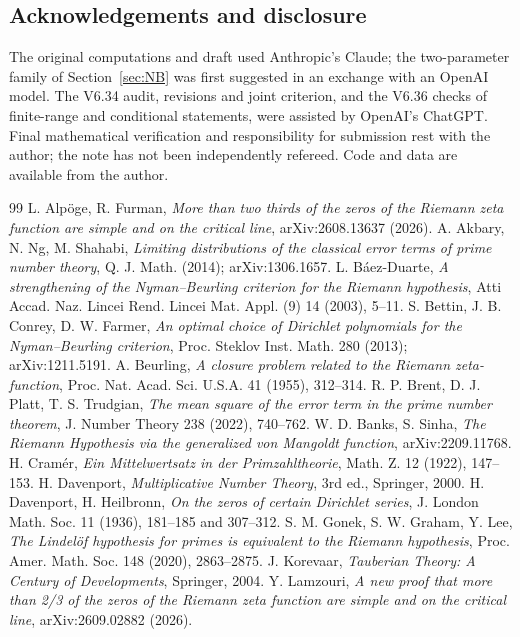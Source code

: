 \documentclass[11pt]{amsart}
\theoremstyle{remark}
\theoremstyle{definition}
\begin{document}
\subsection*{Acknowledgements and disclosure}
The original computations and draft used Anthropic's Claude; the two-parameter family of Section~\ref{sec:NB} was first suggested in an exchange with an OpenAI model. The V6.34 audit, revisions and joint criterion, and the V6.36 checks of finite-range and conditional statements, were assisted by OpenAI's ChatGPT. Final mathematical verification and responsibility for submission rest with the author; the note has not been independently refereed. Code and data are available from the author.

\begin{thebibliography}{99}
 L. Alp\"oge, R. Furman, \emph{More than two thirds of the zeros of the Riemann zeta function are simple and on the critical line}, arXiv:2608.13637 (2026).
 A. Akbary, N. Ng, M. Shahabi, \emph{Limiting distributions of the classical error terms of prime number theory}, Q. J. Math. (2014); arXiv:1306.1657.
 L. B\'aez-Duarte, \emph{A strengthening of the Nyman--Beurling criterion for the Riemann hypothesis}, Atti Accad. Naz. Lincei Rend. Lincei Mat. Appl. (9) 14 (2003), 5--11.
 S. Bettin, J. B. Conrey, D. W. Farmer, \emph{An optimal choice of Dirichlet polynomials for the Nyman--Beurling criterion}, Proc. Steklov Inst. Math. 280 (2013); arXiv:1211.5191.
 A. Beurling, \emph{A closure problem related to the Riemann zeta-function}, Proc. Nat. Acad. Sci. U.S.A. 41 (1955), 312--314.
 R. P. Brent, D. J. Platt, T. S. Trudgian, \emph{The mean square of the error term in the prime number theorem}, J. Number Theory 238 (2022), 740--762.
 W. D. Banks, S. Sinha, \emph{The Riemann Hypothesis via the generalized von Mangoldt function}, arXiv:2209.11768.
 H. Cram\'er, \emph{Ein Mittelwertsatz in der Primzahltheorie}, Math. Z. 12 (1922), 147--153.
 H. Davenport, \emph{Multiplicative Number Theory}, 3rd ed., Springer, 2000.
 H. Davenport, H. Heilbronn, \emph{On the zeros of certain Dirichlet series}, J. London Math. Soc. 11 (1936), 181--185 and 307--312.
 S. M. Gonek, S. W. Graham, Y. Lee, \emph{The Lindel\"of hypothesis for primes is equivalent to the Riemann hypothesis}, Proc. Amer. Math. Soc. 148 (2020), 2863--2875.
 J. Korevaar, \emph{Tauberian Theory: A Century of Developments}, Springer, 2004.
 Y. Lamzouri, \emph{A new proof that more than 2/3 of the zeros of the Riemann zeta function are simple and on the critical line}, arXiv:2609.02882 (2026).

\end{thebibliography}
\end{document}
